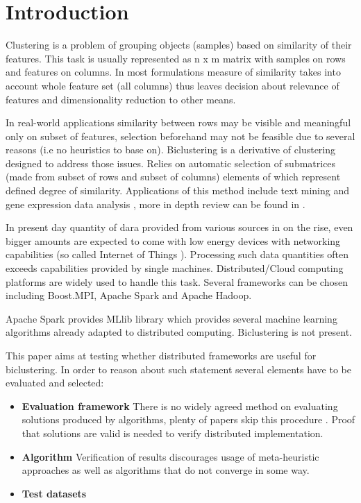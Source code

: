 \chapter{Introduction}
\label{cha:introduction}

Clustering is a problem of grouping objects (samples) based on similarity of their features. This task is usually represented as n x m matrix with samples on rows and features on columns. In most formulations measure of similarity takes into account whole feature set (all columns) thus leaves decision about relevance of features and dimensionality reduction to other means.

In real-world applications similarity between rows may be visible and meaningful only on subset of features, selection beforehand may not be feasible due to several reasons (i.e no heuristics to base on). Biclustering is a derivative of clustering designed to address those issues. Relies on automatic selection of submatrices (made from subset of rows and subset of columns) elements of which represent defined degree of similarity. Applications of this method include text mining and gene expression data analysis \cite{Cheng:2000:BED:645635.660833, tanay_sharan_shamir_2002, 2004_survey}, more in depth review can be found in \cite{Henriques20153941}.

In present day quantity of dara provided from various sources in on the rise, even bigger amounts are expected to come with low energy devices with networking capabilities (so called Internet of Things \cite{ieee-big-data-miyachi}). Processing such data quantities often exceeds capabilities provided by single machines. Distributed/Cloud computing platforms are widely used to handle this task. Several frameworks can be chosen including Boost.MPI, Apache Spark and Apache Hadoop.

Apache Spark provides MLlib library which provides several machine learning algorithms already adapted to distributed computing. Biclustering is not present.

This paper aims at testing whether distributed frameworks are useful for biclustering. In order to reason about such statement several elements have to be evaluated and selected:
\begin{itemize}
	\item \textbf{Evaluation framework} There is no widely agreed method on evaluating solutions produced by algorithms, plenty of papers skip this procedure \cite{doi:10.1093/bioinformatics/btl060}. Proof that solutions are valid is needed to verify distributed implementation.
	\item \textbf{Algorithm} Verification of results discourages usage of meta-heuristic approaches as well as algorithms that do not converge in some way.
	\item \textbf{Test datasets} 
\end{itemize}
 
